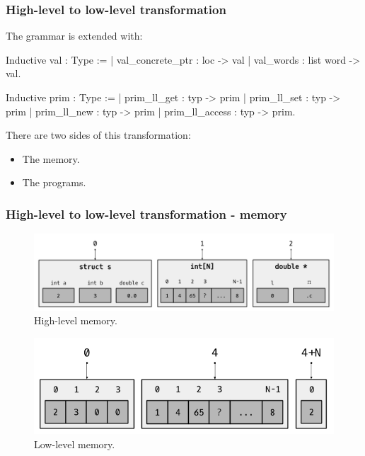 \begin{frame}[fragile]
\frametitle{High-level to low-level transformation}

The grammar is extended with:

\begin{coqs}
  Inductive val : Type :=
    | val_concrete_ptr : loc -> val
    | val_words : list word -> val.
  
  Inductive prim : Type :=
    | prim_ll_get : typ -> prim
    | prim_ll_set : typ -> prim
    | prim_ll_new : typ -> prim
    | prim_ll_access : typ -> prim.
\end{coqs}

\bigskip \pause

There are two sides of this transformation:
\begin{itemize}
	\item The memory.
	\item The programs.
\end{itemize}

\end{frame}


\begin{frame}[fragile]
\frametitle{High-level to low-level transformation - memory}

\begin{center}

\begin{figure}
	\includegraphics[scale=0.31]{images/high_level_memory}
	\caption{High-level memory.}
\end{figure}

\begin{figure}
	\includegraphics[scale=0.31]{images/low_level_memory}
	\caption{Low-level memory.}
\end{figure}

\end{center}

\end{frame}


